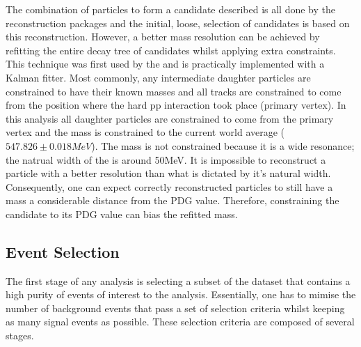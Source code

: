 The combination of particles to form a \Bd candidate described is all done by the \lhcb reconstruction packages and the initial, loose, selection of \Bd candidates is based on this reconstruction. However, a better mass resolution can be achieved by refitting the entire decay tree of \Bd candidates whilst applying extra constraints.  This technique was first used by the \babar and is practically implemented with a Kalman fitter\cite{Hulsbergen:2005pu}.  Most commonly, any intermediate daughter particles are constrained to have their known masses and all tracks are constrained to come from the position where the hard pp interaction took place (primary vertex).  In this analysis all daughter particles are constrained to come from the primary vertex and the \etaz mass is constrained to the current world average ($547.826\pm0.018MeV$)\cite{PDG2014}.  The \Kstar mass is not constrained because it is a wide resonance; the natrual width of the \Kstar is around 50MeV.  It is impossible to reconstruct a particle with a better resolution than what is dictated by it's natural width.  Consequently, one can expect correctly reconstructed \Kstar particles to still have a mass a considerable distance from the PDG value.  Therefore, constraining the \Kstar candidate to its PDG value can bias the refitted \Bd mass.

\subsection{Event Selection}
\label{sec:Selection}

The first stage of any analysis is selecting a subset of the \lhcb dataset that contains a high purity of events of interest to the analysis.  Essentially, one has to mimise the number of background events that pass a set of selection criteria whilst keeping as many signal events as possible. These selection criteria are composed of several stages.

